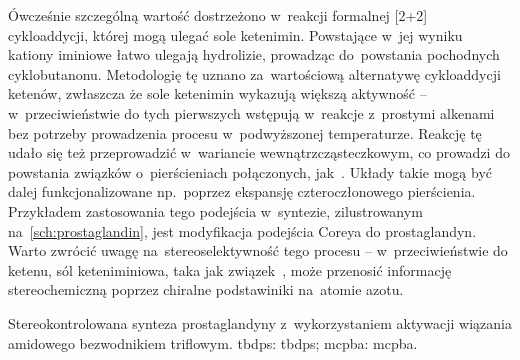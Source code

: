 Ówcześnie szczególną wartość dostrzeżono w~reakcji formalnej [2+2] cykloaddycji, której mogą ulegać sole ketenimin.
Powstające w~jej wyniku kationy iminiowe łatwo ulegają hydrolizie, prowadząc do~powstania pochodnych cyklobutanonu.
Metodologię tę uznano za~wartościową alternatywę cykloaddycji ketenów, zwłaszcza że sole ketenimin wykazują większą aktywność \---
  w~przeciwieństwie do tych pierwszych wstępują w~reakcje z~prostymi alkenami bez potrzeby prowadzenia procesu w~podwyższonej temperaturze\autocite{maulide18}.
Reakcję tę udało się też przeprowadzić w~wariancie wewnątrzcząsteczkowym,
  co prowadzi do powstania związków o~pierścieniach połączonych\autocite{ghosez85}, jak~.
Układy takie mogą być dalej funkcjonalizowane np.~poprzez ekspansję czteroczłonowego pierścienia.
Przykładem zastosowania tego podejścia w~syntezie, zilustrowanym na~\cref{sch:prostaglandin}, jest modyfikacja podejścia Coreya do prostaglandyn\autocite{chen91}.
Warto zwrócić uwagę na~stereoselektywność tego procesu \--- w~przeciwieństwie do ketenu,
  sól keteniminiowa, taka jak związek~, może przenosić informację stereochemiczną poprzez chiralne podstawiniki na~atomie azotu.
\begin{scheme*}
  \centering
  
  \caption{
    Stereokontrolowana synteza prostaglandyny z~wykorzystaniem aktywacji wiązania amidowego bezwodnikiem triflowym.
    \acrshort{tbdps}: \acrlong{tbdps}; \acrshort{mcpba}: \acrlong{mcpba}.
  }
  \label{sch:prostaglandin}
\end{scheme*}

